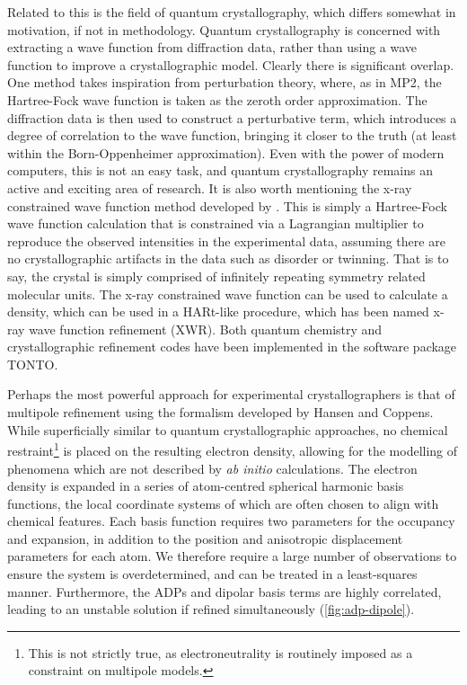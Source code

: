 \begin{refsection}
Related to this is the field of quantum crystallography, which differs somewhat in motivation, if not in methodology.
Quantum crystallography is concerned with extracting a wave function from diffraction data, rather than using a wave function to improve a crystallographic model.
Clearly there is significant overlap.
One method takes inspiration from perturbation theory, where, as in MP2, the Hartree-Fock wave function is taken as the zeroth order approximation.
The diffraction data is then used to construct a perturbative term, which introduces a degree of correlation to the wave function, bringing it closer to the truth (at least within the Born-Oppenheimer approximation).\autocite{Weiss1962}
Even with the power of modern computers, this is not an easy task, and quantum crystallography remains an active and exciting area of research.
It is also worth mentioning the x-ray constrained wave function method developed by \citeauthor{Grimwood2003}.\autocite{Grimwood2003}
This is simply a Hartree-Fock wave function calculation that is constrained via a Lagrangian multiplier to reproduce the observed intensities in the experimental data, assuming there are no crystallographic artifacts in the data such as disorder or twinning.
That is to say, the crystal is simply comprised of infinitely repeating symmetry related molecular units.
The x-ray constrained wave function can be used to calculate a density, which can be used in a HARt-like procedure, which has been named x-ray wave function refinement (XWR).\autocite{Woinska2017}
Both quantum chemistry and crystallographic refinement codes have been implemented in the software package TONTO.\autocite{Jayatilaka2003}

Perhaps the most powerful approach for experimental crystallographers is that of multipole refinement using the formalism developed by Hansen and Coppens.\autocite{Hansen1978}
While superficially similar to quantum crystallographic approaches, no chemical restraint\footnote{This is not strictly true, as electroneutrality is routinely imposed as a constraint on multipole models.} is placed on the resulting electron density, allowing for the modelling of phenomena which are not described by \emph{ab initio} calculations.
The electron density is expanded in a series of atom-centred spherical harmonic basis functions, the local coordinate systems of which are often chosen to align with chemical features.
Each basis function requires two parameters for the occupancy and expansion, in addition to the position and anisotropic displacement parameters for each atom.
We therefore require a large number of observations to ensure the system is overdetermined, and can be treated in a least-squares manner.
Furthermore, the ADPs and dipolar basis terms are highly correlated, leading to an unstable solution if refined simultaneously (\cref{fig:adp-dipole}).


\end{refsection}
